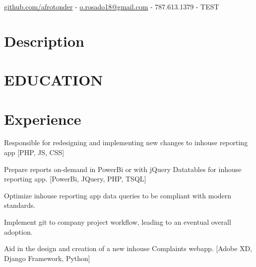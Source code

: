 \documentclass[]{deedy-resume-openfont}
\begin{document}
%
%
\lastupdated

%
%
{
      \color{Maroon} \url{github.com/afrotonder}    
- \color{OliveGreen} \href{mailto:o.rosado18@gmail.com}{o.rosado18@gmail.com} 
- \color{Fuchsia} 787.613.1379
- \color{Tan} TEST

 }



\section{Description}

\section{EDUCATION}
\break
{}


\section{Experience}

\break
{} %
\begin{tightemize}
            \item Responsible for redesigning and implementing new changes to inhouse reporting app [PHP, JS, CSS]
            \item Prepare reports on-demand in PowerBi or with jQuery Datatables for inhouse reporting app. [PowerBi, JQuery, PHP, TSQL]
            \item Optimize inhouse reporting app data queries to be compliant with modern standards. 
            \item Implement git to company project workflow, leading to an eventual overall adoption.
            \item Aid in the design and creation of a new inhouse Complaints webapp. [Adobe XD, Django Framework, Python]
            
         
\end{tightemize}
\end{document}
